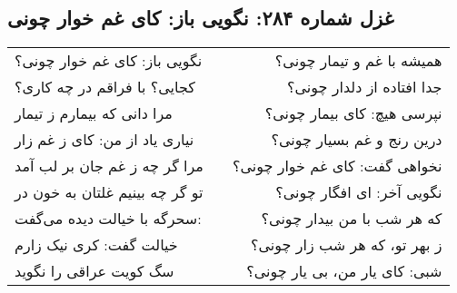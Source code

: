 \begin{center}
\section*{غزل شماره ۲۸۴: نگویی باز: کای غم خوار چونی}
\label{sec:284}
\begin{longtable}{l p{0.5cm} r}
نگویی باز: کای غم خوار چونی؟
&&
همیشه با غم و تیمار چونی؟
\\
کجایی؟ با فراقم در چه کاری؟
&&
جدا افتاده از دلدار چونی؟
\\
مرا دانی که بیمارم ز تیمار
&&
نپرسی هیچ: کای بیمار چونی؟
\\
نیاری یاد از من: کای ز غم زار
&&
درین رنج و غم بسیار چونی؟
\\
مرا گر چه ز غم جان بر لب آمد
&&
نخواهی گفت: کای غم خوار چونی؟
\\
تو گر چه بینیم غلتان به خون در
&&
نگویی آخر: ای افگار چونی؟
\\
سحرگه با خیالت دیده می‌گفت:
&&
که هر شب با من بیدار چونی؟
\\
خیالت گفت: کری نیک زارم
&&
ز بهر تو، که هر شب زار چونی؟
\\
سگ کویت عراقی را نگوید
&&
شبی: کای یار من، بی یار چونی؟
\\
\end{longtable}
\end{center}
